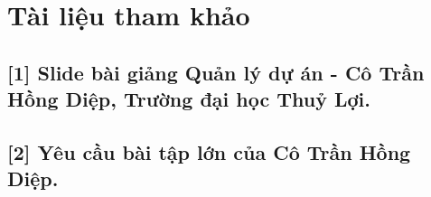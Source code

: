 \chapter*{Tài liệu tham khảo}
\label{tailieuthamkhao}
\section*{[1] Slide bài giảng Quản lý dự án - Cô Trần Hồng Diệp, Trường đại học Thuỷ Lợi.}
\section*{[2] Yêu cầu bài tập lớn của Cô Trần Hồng Diệp.}
